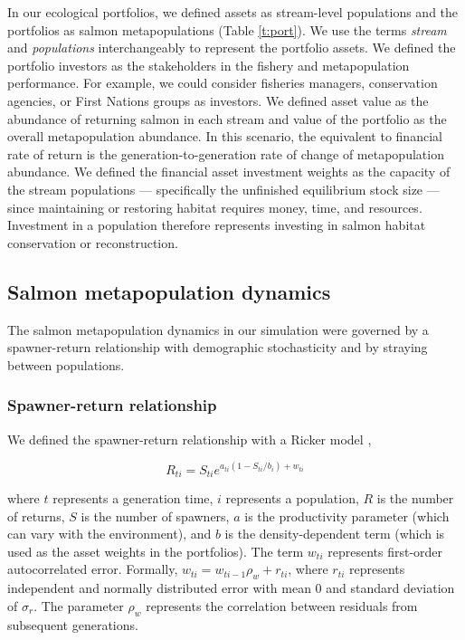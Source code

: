 In our ecological portfolios, we defined assets as stream-level
populations and the portfolios as salmon metapopulations (Table
\ref{t:port}). We use the terms \textit{stream} and \textit{populations}
interchangeably to represent the portfolio assets. We defined the
portfolio investors as the stakeholders in the fishery and
metapopulation performance. For example, we could consider fisheries
managers, conservation agencies, or First Nations groups as investors.
We defined asset value as the abundance of returning salmon in each
stream and value of the portfolio as the overall metapopulation
abundance. In this scenario, the equivalent to financial rate of return
is the generation-to-generation rate of change of metapopulation
abundance. We defined the financial asset investment weights as the
capacity of the stream populations --- specifically the unfinished
equilibrium stock size --- since maintaining or restoring habitat
requires money, time, and resources. Investment in a population
therefore represents investing in salmon habitat conservation or
reconstruction.

\subsection{Salmon metapopulation dynamics}

The salmon metapopulation dynamics in our simulation were governed by a
spawner-return relationship with demographic stochasticity and by
straying between populations.

\subsubsection{Spawner-return relationship}

We defined the spawner-return relationship with a Ricker model
\citep{ricker1954},

\begin{equation}
R_{ti} = S_{ti}e^{a_{ti}(1-S_{ti}/b_i) + w_{ti}}
\end{equation}

\noindent where $t$ represents a generation time, $i$ represents a
population, $R$ is the number of returns, $S$ is the number of spawners,
$a$ is the productivity parameter (which can vary with the environment),
and $b$ is the density-dependent term (which is used as the asset
weights in the portfolios). The term $w_{ti}$ represents first-order
autocorrelated error. Formally, $w_{ti} = w_{ti-1} \rho_w + r_{ti}$,
where $r_{ti}$ represents independent and normally distributed error
with mean 0 and standard deviation of $\sigma_r$. The parameter $\rho_w$
represents the correlation between residuals from subsequent
generations.

